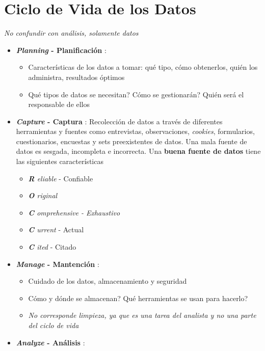 \section{Ciclo de Vida de los Datos}

\textit{No confundir con análisis, solamente datos}

\begin{itemize}
    \item {\textbf{\textit{Planning} - Planificación} :
    \begin{itemize}
        \item {Características de los datos a tomar: qué tipo, cómo obtenerlos, quién los administra, resultados óptimos}
        \item {Qué tipos de datos se necesitan? Cómo se gestionarán? Quién será el responsable de ellos}
    \end{itemize}}
    \item {\textbf{\textit{Capture} - Captura} : Recolección de datos a través de diferentes herramientas y fuentes como entrevistas, observaciones, \textit{cookies}, formularios, cuestionarios, encuestas y sets preexistentes de datos. Una mala fuente de datos es sesgada, incompleta e incorrecta. Una \textbf{buena fuente de datos} tiene las siguientes características
    \begin{itemize}
            \item {\textit{\textbf{R} eliable} - Confiable}
            \item {\textit{\textbf{O} riginal}}
            \item {\textit{\textbf{C} omprehensive - Exhaustivo}}
            \item {\textit{\textbf{C} urrent} - Actual}
            \item {\textit{\textbf{C} ited} - Citado}
        \end{itemize}}
    \item {\textbf{\textit{Manage} - Mantención} :
    \begin{itemize}
        \item {Cuidado de los datos, almacenamiento y seguridad}
        \item {Cómo y dónde se almacenan? Qué herramientas se usan para hacerlo?}
        \item {\textit{No corresponde limpieza, ya que es una tarea del analista y no una parte del ciclo de vida}}
    \end{itemize}}
    \item {\textbf{\textit{Analyze} - Análisis} :
}
\end{itemize}
